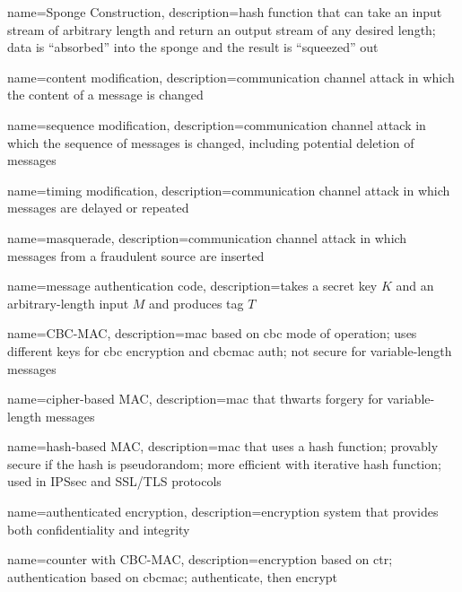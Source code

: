 {
    name={Sponge Construction},
    description={hash function that can take an input stream of arbitrary length and return an output stream of any desired length; data is ``absorbed'' into the sponge and the result is ``squeezed'' out}
}

{
    name={content modification},
    description={communication channel attack in which the content of a message is changed}
}

{
    name={sequence modification},
    description={communication channel attack in which the sequence of messages is changed, including potential deletion of messages}
}

{
    name={timing modification},
    description={communication channel attack in which messages are delayed or repeated}
}

{
    name={masquerade},
    description={communication channel attack in which messages from a fraudulent source are inserted}
}

{
    name={message authentication code},
    description={takes a secret key $K$ and an arbitrary-length input $M$ and produces tag $T$}
}

{
    name={CBC-MAC},
    description={\acrshort{mac} based on \acrfull{cbc} mode of operation; uses different keys for \acrshort*{cbc} encryption and \gls*{cbcmac} auth; not secure for variable-length messages}
}

{
    name={cipher-based MAC},
    description={\acrshort{mac} that thwarts forgery for variable-length messages}
}

{
    name={hash-based MAC},
    description={\acrshort{mac} that uses a hash function; provably secure if the hash is pseudorandom; more efficient with \gls{iterative hash function}; used in IPSsec and SSL/TLS protocols}
}

{
    name={authenticated encryption},
    description={encryption system that provides both \gls{confidentiality} and \gls{integrity}}
}

{
    name={counter with CBC-MAC},
    description={encryption based on \acrfull{ctr}; authentication based on \gls{cbcmac}; authenticate, then encrypt}
}

